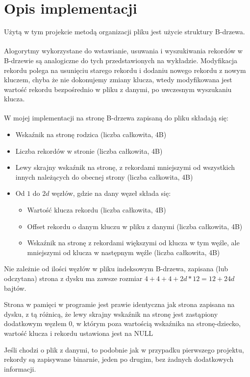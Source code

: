 \documentclass[12pt]{article}
\begin{document}
\section{Opis implementacji}
Użytą w tym projekcie metodą organizacji pliku jest użycie struktury B-drzewa.
\\\\
Alogorytmy wykorzystane do wstawianie, usuwania i wyszukiwania rekordów w B-drzewie są analogiczne do tych
przedstawionych na wykładzie.
Modyfikacja rekordu polega na usunięciu starego rekordu i dodaniu nowego rekordu z nowym kluczem, chyba że
nie dokonujemy zmiany klucza, wtedy modyfikowana jest wartość rekordu bezpośrednio w pliku z danymi, po uwczesnym
wyszukaniu klucza.
\\\\
W mojej implementacji na stronę B-drzewa zapisaną do pliku składają się:
\begin{itemize}
    \item Wskaźnik na stronę rodzica (liczba całkowita, 4B)
    \item Liczba rekordów w stronie (liczba całkowita, 4B)
    \item Lewy skrajny wskaźnik na stronę, z rekordami mniejszymi od wszystkich innych należących do obecnej strony (liczba całkowita, 4B)
    \item Od \(1\) do \(2d\) węzłów, gdzie na dany węzeł składa się:
    \begin{itemize}
        \item Wartość klucza rekordu (liczba całkowita, 4B)
        \item Offset rekordu o danym kluczu w pliku z danymi (liczba całkowita, 4B)
        \item Wskaźnik na stronę z rekordami większymi od klucza w tym węźle, ale mniejszymi od klucza w następnym węźle (liczba całkowita, 4B)
    \end{itemize}
\end{itemize}

Nie zależnie od ilości węzłów w pliku indeksowym B-drzewa, zapisana (lub odczytana) strona
z dysku ma zawsze rozmiar \(4+4+4+2d*12 = 12+24d\) bajtów.

Strona w pamięci w programie jest prawie identyczna jak strona zapisana na dysku, z tą różnicą, że
lewy skrajny wskaźnik na stronę jest zastąpiony dodatkowym węzłem 0, w którym poza wartością wskaźnika na 
stronę-dziecko, wartość klucza i rekordu ustawiona jest na NULL

Jeśli chodzi o plik z danymi, to podobnie jak w przypadku pierwszego projektu, 
rekordy są zapisywane binarnie, jeden po drugim, bez żadnych dodatkowych informacji.
\end{document}
